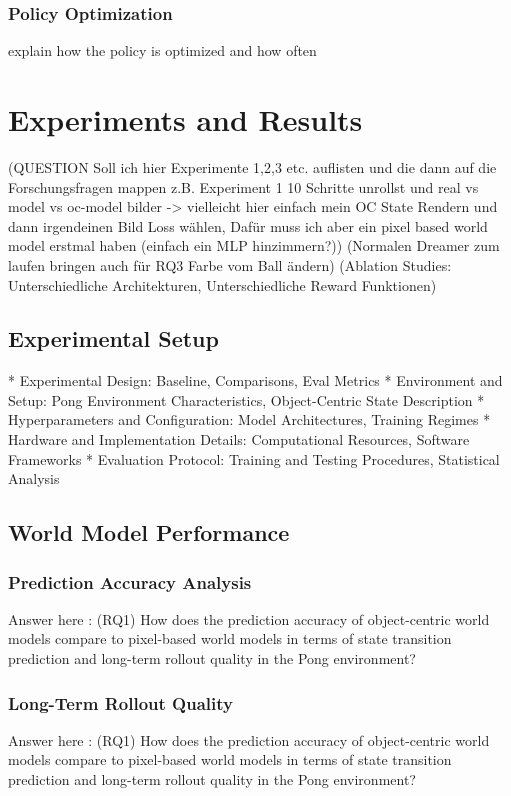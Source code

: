 \documentclass[
	english,
	ruledheaders=section,
	class=report,
	thesis={type=master},
	accentcolor=9c,
	custommargins=true,
	marginpar=false,
	parskip=half-,
	fontsize=11pt,
]{tudapub}
\begin{document}
\subsection{Policy Optimization}
\label{subsec:policy_optimization}
explain how the policy is optimized and how often

\chapter{Experiments and Results}
\label{chap:experiments}
(QUESTION Soll ich hier Experimente 1,2,3 etc. auflisten und die dann auf die Forschungsfragen mappen
z.B. Experiment 1 10 Schritte unrollst und real vs model vs oc-model bilder -> vielleicht hier einfach
mein OC State Rendern und dann irgendeinen Bild Loss wählen, Dafür muss ich aber ein pixel based world model erstmal haben (einfach ein MLP hinzimmern?))
(Normalen Dreamer zum laufen bringen auch für RQ3 Farbe vom Ball ändern)
(Ablation Studies: Unterschiedliche Architekturen, Unterschiedliche Reward Funktionen)

\section{Experimental Setup}
\label{sec:exp_setup}
* Experimental Design: Baseline, Comparisons, Eval Metrics
* Environment and Setup: Pong Environment Characteristics, Object-Centric State Description
* Hyperparameters and Configuration: Model Architectures, Training Regimes
* Hardware and Implementation Details: Computational Resources, Software Frameworks
* Evaluation Protocol: Training and Testing Procedures, Statistical Analysis

\section{World Model Performance}
\label{sec:world_model_perf}

\subsection{Prediction Accuracy Analysis}
\label{subsec:prediction_accuracy}
Answer here : (RQ1) How does the prediction accuracy of object-centric world models compare to pixel-based world models in terms of state transition prediction and long-term rollout quality in the Pong environment?

\subsection{Long-Term Rollout Quality}
\label{subsec:rollout_quality}
Answer here : (RQ1) How does the prediction accuracy of object-centric world models compare to pixel-based world models in terms of state transition prediction and long-term rollout quality in the Pong environment?
\end{document}
